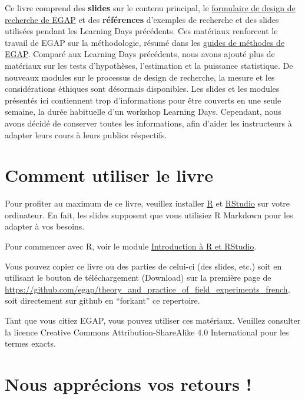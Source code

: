 \documentclass[
  12pt,
]{book}
\begin{document}
Ce livre comprend des \textbf{slides} sur le contenu principal, le \href{researchdesignform.html}{formulaire de design de recherche de EGAP} et des \textbf{références} d'exemples de recherche et des slides utilisées pendant les Learning Days précédents. Ces matériaux renforcent le travail de EGAP sur la méthodologie, résumé dans les \href{https://egap.org/methods-guides/}{guides de méthodes de EGAP}. Comparé aux Learning Days précédents, nous avons ajouté plus de matériaux sur les tests d'hypothèses, l'estimation et la puissance statistique. De nouveaux modules sur le processus de design de recherche, la mesure et les considérations éthiques sont désormais disponibles. Les slides et les modules présentés ici contiennent trop d'informations pour être couverts en une seule semaine, la durée habituelle d'un workshop Learning Days. Cependant, nous avons décidé de conserver toutes les informations, afin d'aider les instructeurs à adapter leurs cours à leurs publics réspectifs.

\hypertarget{comment-utiliser-le-livre}{%
\section{Comment utiliser le livre}\label{comment-utiliser-le-livre}}

Pour profiter au maximum de ce livre, veuillez installer \href{https://cran.r-project.org/}{R} et \href{https://www.rstudio.com/products/rstudio/download/}{RStudio} sur votre ordinateur. En fait, les slides supposent que vous utilisiez R Markdown pour les adapter à vos besoins.

Pour commencer avec R, voir le module \href{introduction-to-r-and-rstudio.html}{Introduction à R et RStudio}.

Vous pouvez copier ce livre ou des parties de celui-ci (des slides, etc.) soit en utilisant le bouton de téléchargement (Download) sur la première page de \url{https://github.com/egap/theory_and_practice_of_field_experiments_french}, soit directement sur github en ``forkant'' ce repertoire.

Tant que vous citiez EGAP, vous pouvez utiliser ces matériaux. Veuillez consulter la licence Creative Commons Attribution-ShareAlike 4.0 International pour les termes exacts.

\hypertarget{nous-appruxe9cions-vos-retours}{%
\section{Nous apprécions vos retours !}\label{nous-appruxe9cions-vos-retours}}
\end{document}
